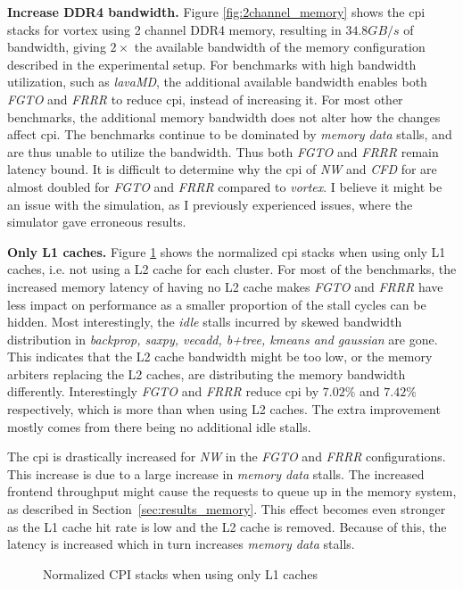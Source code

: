 \vspace{1mm}\noindent
\textbf{Increase DDR4 bandwidth.} Figure \ref{fig:2channel_memory} shows the \acrshort{cpi} stacks for \Gls{vortex} using 2 channel DDR4 memory, resulting in $34.8GB/s$ of bandwidth, giving $2\times$ the available bandwidth of the memory configuration described in the experimental setup. For benchmarks with high bandwidth utilization, such as \textit{lavaMD}, the additional available bandwidth enables both \textit{FGTO} and \textit{FRRR} to reduce \acrshort{cpi}, instead of increasing it. For most other benchmarks, the additional memory bandwidth does not alter how the changes affect \acrshort{cpi}. The benchmarks continue to be dominated by \textit{memory data} stalls, and are thus unable to utilize the bandwidth. Thus both \textit{FGTO} and \textit{FRRR} remain latency bound. It is difficult to determine why the \acrshort{cpi} of \textit{NW} and \textit{CFD} for are almost doubled for \textit{FGTO} and \textit{FRRR} compared to \textit{\Gls{vortex}}. I believe it might be an issue with the simulation, as I previously experienced issues, where the simulator gave erroneous results.

\newpage
\vspace{1mm}\noindent
\textbf{Only L1 caches.} Figure \ref{fig:norm_cpi_L1} shows the normalized \acrshort{cpi} stacks when using only L1 caches, i.e. not using a L2 cache for each cluster. For most of the benchmarks, the increased memory latency of having no L2 cache makes \textit{FGTO} and \textit{FRRR} have less impact on performance as a smaller proportion of the stall cycles can be hidden. Most interestingly, the \textit{idle} stalls incurred by skewed bandwidth distribution in \textit{backprop, saxpy, vecadd, b+tree, kmeans and gaussian} are gone. This indicates that the L2 cache bandwidth might be too low, or  the memory arbiters replacing the L2 caches, are distributing the memory bandwidth differently. Interestingly \textit{FGTO} and \textit{FRRR} reduce \acrshort{cpi} by $7.02\%$ and $7.42\%$ respectively, which is more than when using L2 caches. The extra improvement mostly comes from there being no additional idle stalls. 

The \acrshort{cpi} is drastically increased for \textit{NW} in the \textit{FGTO} and \textit{FRRR} configurations. This increase is due to a large increase in \textit{memory data} stalls. The increased frontend throughput might cause the requests to queue up in the memory system, as described in Section~\ref{sec:results_memory}. This effect becomes even stronger as the L1 cache hit rate is low and the L2 cache is removed. Because of this, the latency is increased which in turn increases \textit{memory data} stalls.

\begin{figure}
    \centering
    \caption{Normalized CPI stacks when using only L1 caches}
    \label{fig:norm_cpi_L1}
\end{figure}